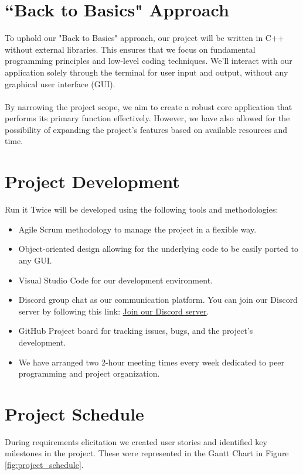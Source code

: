 \documentclass{article}
\let\oldhref\href
\renewcommand{\href}[2]{\uline{\oldhref{#1}{#2}}}
\begin{document}
\section*{``Back to Basics" Approach}
To uphold our "Back to Basics" approach, our project will be written in C++ without external libraries. This ensures that we focus on fundamental programming principles and low-level coding techniques. We'll interact with our application solely through the terminal for user input and output, without any graphical user interface (GUI).
\\ \\
By narrowing the project scope, we aim to create a robust core application that performs its primary function effectively. However, we have also allowed for the possibility of expanding the project's features based on available resources and time. 

\section*{Project Development}
Run it Twice will be developed using the following tools and methodologies:

\begin{itemize}
    \item Agile Scrum methodology to manage the project in a flexible way.
    \item Object-oriented design allowing for the underlying code to be easily ported to any GUI.
    \item Visual Studio Code for our development environment.
    \item Discord group chat as our communication platform. You can join our Discord server by following this link: \href{https://discord.gg/jnGg3t9h7V}{Join our Discord server}.
    \item GitHub Project board for tracking issues, bugs, and the project's development.
    \item We have arranged two 2-hour meeting times every week dedicated to peer programming and project organization.
\end{itemize}

\section*{Project Schedule}

During requirements elicitation we created user stories and identified key milestones in the project. These were represented in the Gantt Chart in Figure \ref{fig:project_schedule}. 
\end{document}
